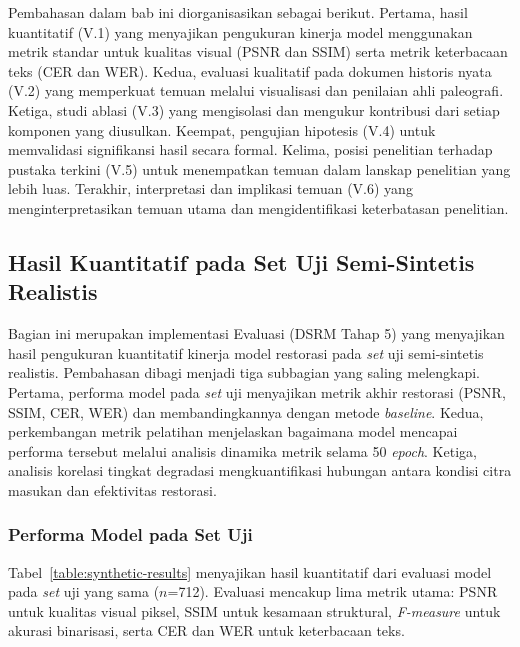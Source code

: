 Pembahasan dalam bab ini diorganisasikan sebagai berikut. Pertama, hasil kuantitatif (V.1) yang menyajikan pengukuran kinerja model menggunakan metrik standar untuk kualitas visual (PSNR dan SSIM) serta metrik keterbacaan teks (CER dan WER). Kedua, evaluasi kualitatif pada dokumen historis nyata (V.2) yang memperkuat temuan melalui visualisasi dan penilaian ahli paleografi. Ketiga, studi ablasi (V.3) yang mengisolasi dan mengukur kontribusi dari setiap komponen yang diusulkan. Keempat, pengujian hipotesis (V.4) untuk memvalidasi signifikansi hasil secara formal. Kelima, posisi penelitian terhadap pustaka terkini (V.5) untuk menempatkan temuan dalam lanskap penelitian yang lebih luas. Terakhir, interpretasi dan implikasi temuan (V.6) yang menginterpretasikan temuan utama dan mengidentifikasi keterbatasan penelitian.

\subsection{Hasil Kuantitatif pada Set Uji Semi-Sintetis Realistis}
\label{subsec:hasil-kuantitatif}

Bagian ini merupakan implementasi Evaluasi (DSRM Tahap 5) yang menyajikan hasil pengukuran kuantitatif kinerja model restorasi pada \textit{set} uji semi-sintetis realistis. Pembahasan dibagi menjadi tiga subbagian yang saling melengkapi. Pertama, performa model pada \textit{set} uji menyajikan metrik akhir restorasi (PSNR, SSIM, CER, WER) dan membandingkannya dengan metode \textit{baseline}. Kedua, perkembangan metrik pelatihan menjelaskan bagaimana model mencapai performa tersebut melalui analisis dinamika metrik selama 50 \textit{epoch}. Ketiga, analisis korelasi tingkat degradasi mengkuantifikasi hubungan antara kondisi citra masukan dan efektivitas restorasi.

\subsubsection{Performa Model pada Set Uji}
\label{subsubsec:performa-set-uji}

Tabel~\ref{table:synthetic-results} menyajikan hasil kuantitatif dari evaluasi model pada \textit{set} uji yang sama ($n$=712). Evaluasi mencakup lima metrik utama: PSNR untuk kualitas visual piksel, SSIM untuk kesamaan struktural, \textit{F-measure} untuk akurasi binarisasi, serta CER dan WER untuk keterbacaan teks.

